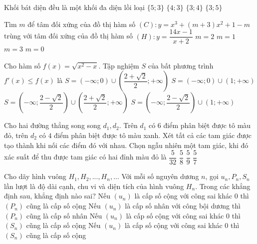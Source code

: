 \begin{ex}%
Khối bát diện đều là một khối đa diện lồi loại
\choice
{$\{5;3\}$}
{$\{4;3\}$}
{\True $\{3;4\}$}
{$\{3;5\}$}
\end{ex}

\begin{ex}%
Tìm $m$ để tâm đối xứng của đồ thị hàm số $(C) : y= x^3+(m+3)x^2+1-m$ trùng với tâm đối xứng của đồ thị hàm số $(H):y=\dfrac{14x-1}{x+2}$
\choice
{$m=2$}
{$m=1$}
{\True $m=3$}
{$m=0$}
\end{ex}

\begin{ex}%
Cho hàm số $f(x) = \sqrt{x^2-x}$. Tập nghiệm $S$ của bất phương trình $f'(x) \leq f(x)$ là
\choice
{\True $S=\left (-\infty;0\right)  \cup \left ( \dfrac{2+\sqrt{2}}{2};+\infty\right )$}
{$S=\left (-\infty;0\right)  \cup \left ( 1;+\infty\right )$}
{$S=\left (-\infty;\dfrac{2-\sqrt{2}}{2}\right)  \cup \left ( \dfrac{2+\sqrt{2}}{2};+\infty\right )$}
{$S=\left (-\infty;\dfrac{2-\sqrt{2}}{2}\right)  \cup \left ( 1;+\infty\right )$}
\end{ex}

\begin{ex}%
Cho hai đường thẳng song song $d_1,d_2$. Trên $d_1$ có $6$ điểm phân biệt được tô màu đỏ, trên $d_2$ có $4$ điểm phân biệt được tô màu xanh. Xét tất cả các tam giác được tạo thành khi nối các điểm đó với nhau. Chọn ngẫu nhiên một tam giác, khi đó xác suất để thu được tam giác có hai đỉnh màu đỏ là
\choice
{$\dfrac{5}{32}$}
{\True $\dfrac{5}{8}$}
{$\dfrac{5}{9}$}
{$\dfrac{5}{7}$}
\end{ex}

\begin{ex}%
Cho dãy hình vuông $H_1,H_2, ..., H_n,...$ Với mỗi số nguyên dương $n$, gọi $u_n,P_n,S_n$ lần lượt là độ dài cạnh, chu vi và diện tích của hình vuông $H_n$. Trong các khẳng định sau, khẳng định nào sai?
\choice
{Nếu $(u_n)$ là cấp số cộng với công sai khác $0$ thì $(P_n)$ cũng là cấp số cộng}
{Nếu $(u_n)$ là cấp số nhân với công bội dương thì $(P_n)$ cũng là cấp số nhân}
{\True Nếu $(u_n)$ là cấp số cộng với công sai khác $0$ thì $(S_n)$ cũng là cấp số cộng}
{Nếu $(u_n)$ là cấp số cộng với công sai khác $0$ thì $(S_n)$ cũng là cấp số cộng}
\end{ex}

